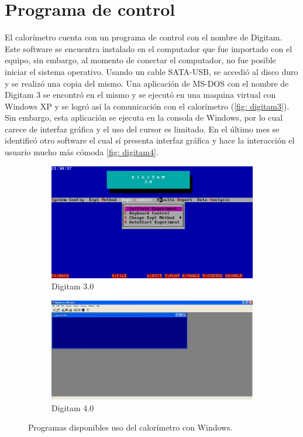 	\section{Programa de control}
	El calorímetro cuenta con un programa de control con el nombre de Digitam. Este software se encuentra instalado en el computador que fue importado con el equipo, sin embargo, al momento de conectar el computador, no fue posible iniciar el sistema operativo. Usando un cable SATA-USB, se accedió al disco duro y se realizó una copia del mismo. Una aplicación de MS-DOS con el nombre de Digitam 3 se encontró en el mismo y se ejecutó en una maquina virtual con Windows XP y se logr\'o as\'i la comunicación con el calorímetro (\autoref{fig: digitam3}). Sin embargo, esta aplicaci\'on se ejecuta en la consola de Windows, por lo cual carece de interfaz gr\'afica y el uso del cursor es limitado. En el \'ultimo mes se identific\'o otro software el cual sí presenta interfaz gr\'afica y hace la interacci\'on el usuario mucho m\'as c\'omoda \autoref{fig: digitam4}.
	\begin{figure}[h]
		\centering
		\begin{subfigure}{0.45\linewidth}
			\includegraphics[width=\linewidth]{Figures/digitam}
			\caption{Digitam 3.0}
			\label{fig: digitam3}
		\end{subfigure}
		\begin{subfigure}{0.54\linewidth}
			\includegraphics[width=\linewidth]{Figures/digitamView}
			\caption{Digitam 4.0}
			\label{fig: digitam4}
		\end{subfigure}
		\caption{Programas disponibles uso del calor\'imetro con Windows.}
	\end{figure}
	

